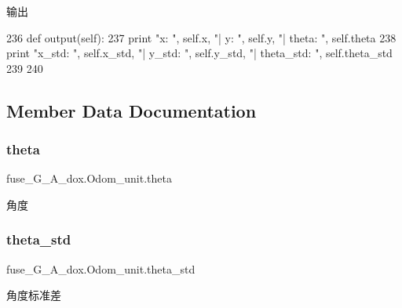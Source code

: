 输出 


\begin{DoxyCode}
236     \textcolor{keyword}{def }output(self):
237         \textcolor{keywordflow}{print} \textcolor{stringliteral}{"x: "}, self.x, \textcolor{stringliteral}{"| y: "}, self.y, \textcolor{stringliteral}{"| theta: "}, self.theta
238         \textcolor{keywordflow}{print} \textcolor{stringliteral}{"x\_std: "}, self.x\_std, \textcolor{stringliteral}{"| y\_std: "}, self.y\_std, \textcolor{stringliteral}{"| theta\_std: "}, self.theta\_std
239 
240 
\end{DoxyCode}


\subsection{Member Data Documentation}
\mbox{\label{classfuse___g___a__dox_1_1_odom__unit_ad864893c7fc67898f7f18e83f846a927}} 
\subsubsection{\texorpdfstring{theta}{theta}}
{\footnotesize\ttfamily fuse\+\_\+\+G\+\_\+\+A\+\_\+dox.\+Odom\+\_\+unit.\+theta}



角度 

\mbox{\label{classfuse___g___a__dox_1_1_odom__unit_a9284f87eb0eb331da4bec2760634b356}} 
\subsubsection{\texorpdfstring{theta\+\_\+std}{theta\_std}}
{\footnotesize\ttfamily fuse\+\_\+\+G\+\_\+\+A\+\_\+dox.\+Odom\+\_\+unit.\+theta\+\_\+std}



角度标准差 

